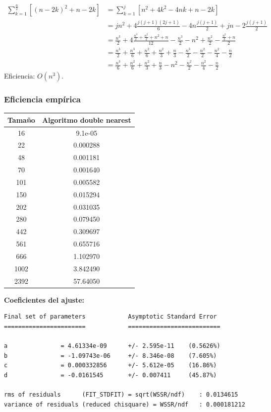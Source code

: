 \documentclass[a4]{article}
\begin{document}
  \begin{align*}
  \sum_{k=1}^{\frac{n}{2}}[(n-2k)^2+n-2k] &=\sum_{k=1}^j[n^2+4k^2-4nk+n-2k]\\&=jn^2+4\frac{j(j+1)(2j+1)}{6}-4n\frac{j(j+1)}{2}+jn-2\frac{j(j+1)}{2}\\&=\frac{n^3}{2}+4\frac{\frac{n^3}{2}+\frac{n^2}{2}+n^2+n}{12}-\frac{n^3}{2}-n^2+\frac{n^2}{2}-\frac{\frac{n^2}{2}+n}{2}\\&=\frac{n^3}{2}+\frac{n^3}{6}+\frac{n^2}{6}+\frac{n^2}{3}+\frac{n}{3}-\frac{n^3}{2}-\frac{n^2}{2}-\frac{n^2}{4}-\frac{n}{2}\\&=\frac{n^3}{6}+\frac{n^2}{6}+\frac{n^2}{3}+\frac{n}{3}-n^2-\frac{n^2}{2}-\frac{n^2}{4}-\frac{n}{2}
  \end{align*}
  Eficiencia: $O(n^3)$.

\subsubsection{Eficiencia empírica}

\begin{tabular}{|c|c|} \hline
\textbf{Tamaño}& 
\textbf{Algoritmo double nearest}
  \\ \hline
     16      & 9.1e-05   \\
     22      & 0.000288  \\
     48      & 0.001181  \\
     70      & 0.001640  \\
     101     & 0.005582            \\
     150     & 0.015294  \\
     202     & 0.031035  \\
     280     & 0.079450    \\
     442     & 0.309697    \\
     561     & 0.655716  \\
     666     & 1.102970       \\
     1002    & 3.842490  \\
     2392    & 57.64050   \\
\hline
\end{tabular}

\vspace{5mm}
\textbf{Coeficientes del ajuste:}
\begin{verbatim}
Final set of parameters            Asymptotic Standard Error
=======================            ==========================

a               = 4.61334e-09      +/- 2.595e-11    (0.5626%)
b               = -1.09743e-06     +/- 8.346e-08    (7.605%)
c               = 0.000332856      +/- 5.612e-05    (16.86%)
d               = -0.0161545       +/- 0.007411     (45.87%)

rms of residuals      (FIT_STDFIT) = sqrt(WSSR/ndf)    : 0.0134615
variance of residuals (reduced chisquare) = WSSR/ndf   : 0.000181212
\end{verbatim}
\end{document}
